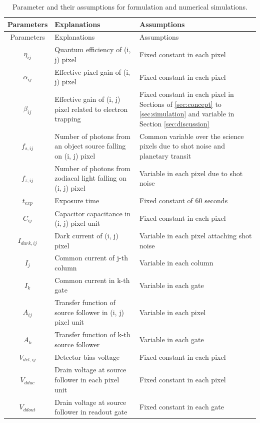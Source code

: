 \documentclass{aastex62}
\begin{document}
\setcounter{table}{0}
\renewcommand{\thetable}{\Alph{table}}
\begin{longtable}[H]{|c|p{7cm}|p{7cm}|}
\caption{Parameter and their assumptions for formulation and numerical simulations.}
\label{tab:appendixA} \\ \hline
Parameters & Explanations & Assumptions \\ \hline \hline
\endfirsthead \hline
Parameters & Explanations & Assumptions \\ \hline \hline
\endhead
$\eta_{ij}$ & Quantum efficiency of (i, j) pixel & Fixed constant in each pixel \\ \hline
$\alpha_{ij}$ & Effective pixel gain of (i, j) pixel & Fixed constant in each pixel \\ \hline
$\beta_{ij}$ & Effective gain of (i, j) pixel related to electron trapping & Fixed constant in each pixel in Sections of \ref{sec:concept} to \ref{sec:simulation} and variable in Section \ref{sec:discussion} \\ \hline
$f_{s,ij}$ & Number of photons from an object source falling on (i, j) pixel & Common variable over the science pixels due to shot noise and planetary transit \\ \hline
$f_{z,ij}$ & Number of photons from zodiacal light falling on (i, j) pixel & Variable in each pixel due to shot noise \\ \hline
$t_{exp}$ & Exposure time & Fixed constant of 60 seconds \\ \hline
$C_{ij}$ & Capacitor capacitance in (i, j) pixel unit & Fixed constant in each pixel \\ \hline
$I_{dark,ij}$ & Dark current of (i, j) pixel & Variable in each pixel attaching shot noise \\ \hline
$I_{j}$ & Common current of j-th column & Variable in each column \\ \hline
$I_{k}$ & Common current in k-th gate & Variable in each gate \\ \hline
$A_{ij}$ & Transfer function of source follower in (i, j) pixel unit & Variable in each pixel \\ \hline
$A_{k}$ & Transfer function of k-th source follower & Variable in each gate \\ \hline
$V_{det,ij}$ & Detector bias voltage & Fixed constant in each pixel \\ \hline
$V_{dduc}$ & Drain voltage at source follower in each pixel unit & Fixed constant in each pixel \\ \hline
$V_{ddout}$ & Drain voltage at source follower in readout gate & Fixed constant in each gate \\ \hline

\end{longtable}
\end{document}
